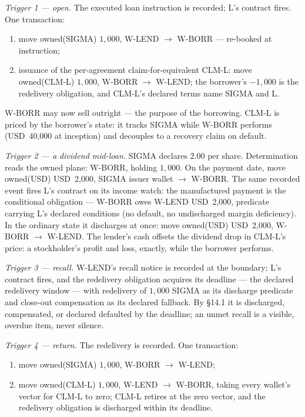 \documentclass[11pt,a4paper]{article}
\newcommand{\USD}[1]{\mbox{USD~#1}}
\begin{document}
\emph{Trigger 1 --- open.} The executed loan instruction is recorded; L's
contract fires. One transaction:
\begin{enumerate}[label=(\arabic*),nosep]
\item move owned(SIGMA) $1{,}000$, W-LEND $\to$ W-BORR --- re-booked at
instruction;
\item issuance of the per-agreement claim-for-equivalent CLM-L: move
owned(CLM-L) $1{,}000$, W-BORR $\to$ W-LEND; the borrower's $-1{,}000$ is the
redelivery obligation, and CLM-L's declared terms name SIGMA and L.
\end{enumerate}
W-BORR may now sell outright --- the purpose of the borrowing. CLM-L is
priced by the borrower's state: it tracks SIGMA while W-BORR performs
(\USD{40,000} at inception) and decouples to a recovery claim on default.

\emph{Trigger 2 --- a dividend mid-loan.} SIGMA declares $2.00$ per share.
Determination reads the owned plane: W-BORR, holding $1{,}000$. On the payment
date, move owned(USD) \USD{2,000}, SIGMA issuer wallet $\to$ W-BORR. The same
recorded event fires L's contract on its income watch: the manufactured
payment is the conditional obligation --- W-BORR owes W-LEND \USD{2,000},
predicate carrying L's declared conditions (no default, no undischarged margin
deficiency). In the ordinary state it discharges at once: move owned(USD)
\USD{2,000}, W-BORR $\to$ W-LEND. The lender's cash offsets the dividend drop
in CLM-L's price: a stockholder's profit and loss, exactly, while the borrower
performs.

\emph{Trigger 3 --- recall.} W-LEND's recall notice is recorded at the
boundary; L's contract fires, and the redelivery obligation acquires its
deadline --- the declared redelivery window --- with redelivery of $1{,}000$
SIGMA as its discharge predicate and close-out compensation as its declared
fallback. By \S14.1 it is discharged, compensated, or declared defaulted by
the deadline; an unmet recall is a visible, overdue item, never silence.

\emph{Trigger 4 --- return.} The redelivery is recorded. One transaction:
\begin{enumerate}[label=(\arabic*),nosep]
\item move owned(SIGMA) $1{,}000$, W-BORR $\to$ W-LEND;
\item move owned(CLM-L) $1{,}000$, W-LEND $\to$ W-BORR, taking every wallet's
vector for CLM-L to zero; CLM-L retires at the zero vector, and the
redelivery obligation is discharged within its deadline.
\end{enumerate}
\end{document}
